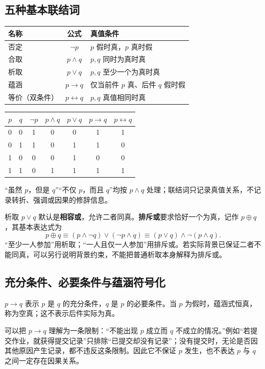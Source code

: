 \documentclass[UTF8,fontset=none,zihao=-4,a4paper]{ctexart}
\newcommand{\term}[1]{\textbf{#1}}
\begin{document}
\subsection{五种基本联结词}
\begin{center}
\begin{tabularx}{\linewidth}{l c Y}
\toprule 名称 & 公式 & 真值条件\\\midrule
否定 & $\neg p$ & $p$ 假时真，$p$ 真时假\\
合取 & $p\land q$ & $p,q$ 同时为真时真\\
析取 & $p\lor q$ & $p,q$ 至少一个为真时真\\
蕴涵 & $p\to q$ & 仅当前件 $p$ 真、后件 $q$ 假时假\\
等价（双条件） & $p\leftrightarrow q$ & $p,q$ 真值相同时真\\\bottomrule
\end{tabularx}
\end{center}
\begin{center}
\begin{tabular}{cc|ccccc}
\toprule $p$&$q$&$\neg p$&$p\land q$&$p\lor q$&$p\to q$&$p\leftrightarrow q$\\\midrule
0&0&1&0&0&1&1\\
0&1&1&0&1&1&0\\
1&0&0&0&1&0&0\\
1&1&0&1&1&1&1\\\bottomrule
\end{tabular}
\end{center}
“虽然 $p$，但是 $q$”“不仅 $p$，而且 $q$”均按 $p\land q$ 处理；联结词只记录真值关系，不记录转折、强调或因果的修辞信息。

析取 $p\lor q$ 默认是\term{相容或}，允许二者同真。\term{排斥或}要求恰好一个为真，记作 $p\oplus q$，其基本表达式为
\[
p\oplus q\equiv(p\land\neg q)\lor(\neg p\land q)
\equiv(p\lor q)\land\neg(p\land q).
\]
“至少一人参加”用析取；“一人且仅一人参加”用排斥或。若实际背景已保证二者不能同真，可以另行说明背景约束，不能把普通析取本身解释为排斥或。

\subsection{充分条件、必要条件与蕴涵符号化}
$p\to q$ 表示 $p$ 是 $q$ 的充分条件，$q$ 是 $p$ 的必要条件。当 $p$ 为假时，蕴涵式恒真，称为空真；这不表示后件实际为真。

可以把 $p\to q$ 理解为一条限制：“不能出现 $p$ 成立而 $q$ 不成立的情况。”例如“若提交作业，就获得提交记录”只排除“已提交却没有记录”；没有提交时，无论是否因其他原因产生记录，都不违反这条限制。因此它不保证 $p$ 发生，也不表达 $p$ 与 $q$ 之间一定存在因果关系。
\end{document}
